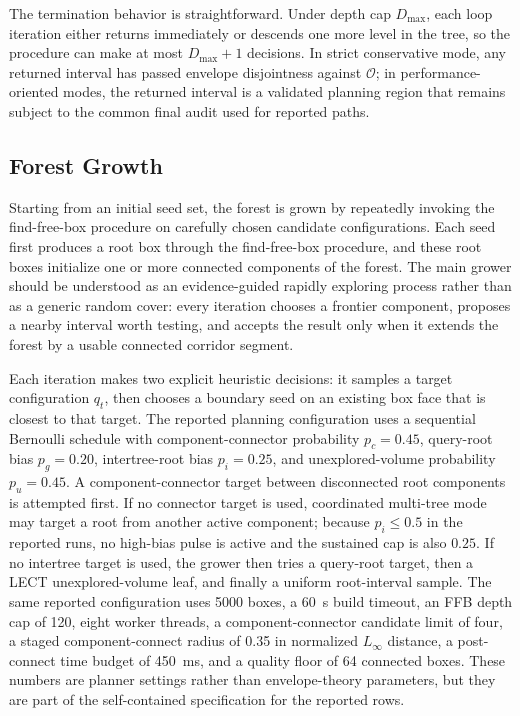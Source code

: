 \documentclass[journal]{IEEEtran}
\newcommand{\calO}{\ensuremath{\mathcal{O}}}
\begin{document}
The termination behavior is straightforward. Under depth cap $D_{\max}$, each
loop iteration either returns immediately or descends one more level in the
tree, so the procedure can make at most $D_{\max}+1$ decisions. In strict
conservative mode, any returned interval has passed envelope disjointness
against $\calO$; in performance-oriented modes, the returned interval is a
validated planning region that remains subject to the common final audit used
for reported paths.

\subsection{Forest Growth}\label{sec:forest_growth}

Starting from an initial seed set, the forest is grown by repeatedly invoking
the find-free-box procedure on carefully chosen candidate configurations.
Each seed first produces a root box through the find-free-box procedure, and
these root boxes initialize one or more connected components of the forest.
The main grower should be understood as an evidence-guided rapidly exploring
process rather than as a generic random cover: every iteration chooses a
frontier component, proposes a nearby interval worth testing, and accepts the
result only when it extends the forest by a usable connected corridor segment.

Each iteration makes two explicit heuristic decisions: it samples a target
configuration $q_t$, then chooses a boundary seed on an existing box face that
is closest to that target. The reported planning configuration uses a sequential
Bernoulli schedule with component-connector probability $p_c=0.45$, query-root
bias $p_g=0.20$, intertree-root bias $p_i=0.25$, and unexplored-volume
probability $p_u=0.45$. A component-connector target between disconnected root
components is attempted first. If no connector target is used, coordinated
multi-tree mode may target a root from another active component; because
$p_i\le 0.5$ in the reported runs, no high-bias pulse is active and the
sustained cap is also $0.25$. If no intertree target is used, the grower then
tries a query-root target, then a LECT unexplored-volume leaf, and finally a
uniform root-interval sample. The same reported configuration uses 5000 boxes,
a 60~s build timeout, an FFB depth cap of 120, eight worker threads, a
component-connector candidate limit of four, a staged component-connect radius
of 0.35 in normalized $L_\infty$ distance, a post-connect time budget of
450~ms, and a quality floor of 64 connected boxes. These numbers are planner
settings rather than envelope-theory parameters, but they are part of the
self-contained specification for the reported rows.
\end{document}

